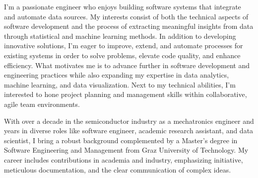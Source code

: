 \documentclass[a4paper]{./src/resume-cv}
\begin{document}
\lastupdated

\maketitlearea{}{-}

\begin{minipage}[t]{\textwidth}
    \begin{onecolumncventry}[1]
        I’m a passionate engineer who enjoys building software systems that integrate and automate data sources. My interests consist of both the technical aspects of software development and the process of extracting meaningful insights from data through statistical and machine learning methods. In addition to developing innovative solutions, I’m eager to improve, extend, and automate processes for existing systems in order to solve problems, elevate code quality, and enhance efficiency. What motivates me is to advance further in software development and engineering practices while also expanding my expertise in data analytics, machine learning, and data visualization. Next to my technical abilities, I’m interested to hone project planning and management skills within collaborative, agile team environments.
        \subsectionsep

        With over a decade in the semiconductor industry as a mechatronics engineer and years in diverse roles like software engineer, academic research assistant, and data scientist, I bring a robust background complemented by a Master’s degree in Software Engineering and Management from Graz University of Technology. My career includes contributions in academia and industry, emphasizing initiative, meticulous documentation, and the clear communication of complex ideas.

   

\end{onecolumncventry}
\end{minipage}
\end{document}
